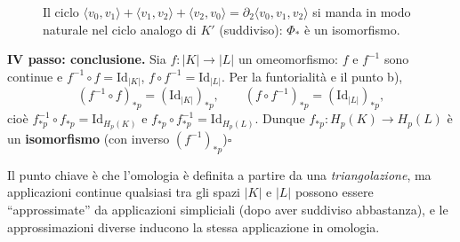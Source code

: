 \begin{figure}[H]
    \centering
    \caption{Il ciclo $\langle v_0,v_1\rangle + \langle v_1,v_2\rangle + \langle v_2,v_0\rangle = \partial_2 \langle v_0,v_1,v_2\rangle$ si manda in modo naturale nel ciclo analogo di $K'$ (suddiviso): $\Phi_*$ \`e un isomorfismo.}
\end{figure}

\textbf{IV passo: conclusione.} Sia $f: |K| \to |L|$ un omeomorfismo: $f$ e $f^{-1}$ sono continue e $f^{-1} \circ f = \mathrm{Id}_{|K|}$, $f \circ f^{-1} = \mathrm{Id}_{|L|}$. Per la funtorialit\`a e il punto b),
\[
(f^{-1} \circ f)_{*p} = (\mathrm{Id}_{|K|})_{*p}, \qquad (f \circ f^{-1})_{*p} = (\mathrm{Id}_{|L|})_{*p},
\]
cio\`e $f^{-1}_{*p} \circ f_{*p} = \mathrm{Id}_{H_p(K)}$ e $f_{*p} \circ f^{-1}_{*p} = \mathrm{Id}_{H_p(L)}$. Dunque $f_{*p}: H_p(K) \to H_p(L)$ \`e un \textbf{isomorfismo} (con inverso $(f^{-1})_{*p}$)\hfill$\square$

\begin{intuizione}
Il punto chiave \`e che l'omologia \`e definita a partire da una \emph{triangolazione}, ma applicazioni continue qualsiasi tra gli spazi $|K|$ e $|L|$ possono essere ``approssimate'' da applicazioni simpliciali (dopo aver suddiviso abbastanza), e le approssimazioni diverse inducono la stessa applicazione in omologia.
\end{intuizione}


